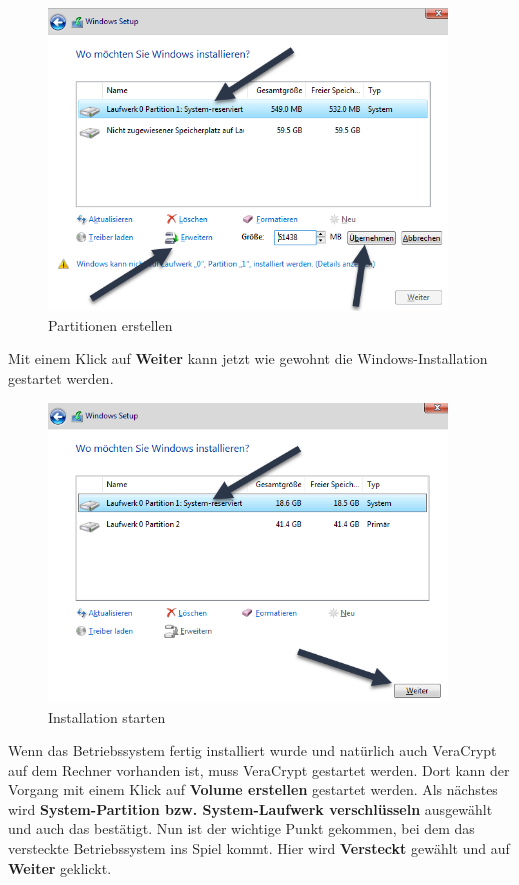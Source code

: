 \documentclass[12pt,a4paper]{scrreprt}
\begin{document}
\begin{figure}[h]
\begin{center}
\includegraphics[width=300pt]{media/hb3.png}
\caption{Partitionen erstellen}
\label{hb3}
\end{center}
\end{figure}

\newpage

\noindent Mit einem Klick auf \textbf{Weiter} kann jetzt wie gewohnt die Windows-Installation gestartet werden.

\begin{figure}[h]
\begin{center}
\includegraphics[width=300pt]{media/hb4.png}
\caption{Installation starten}
\label{hb4}
\end{center}
\end{figure}

\noindent Wenn das Betriebssystem fertig installiert wurde und natürlich auch VeraCrypt auf dem Rechner vorhanden ist, muss VeraCrypt gestartet werden. Dort kann der Vorgang mit einem Klick auf \textbf{Volume erstellen} gestartet werden. Als nächstes wird \textbf{System-Partition bzw. System-Laufwerk verschlüsseln} ausgewählt und auch das bestätigt. Nun ist der wichtige Punkt gekommen, bei dem das versteckte Betriebssystem ins Spiel kommt. Hier wird \textbf{Versteckt} gewählt und auf \textbf{Weiter} geklickt.
\end{document}
